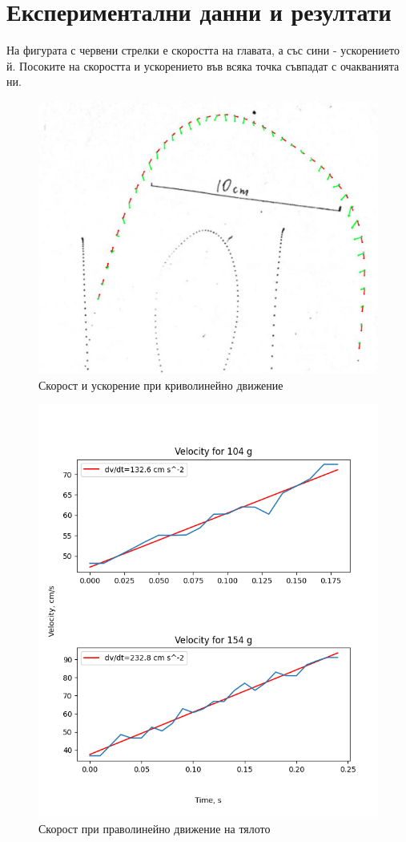 \documentclass[aps, prb, twocolumn, a4paper, floatfix, reprint]{revtex4-2}
\begin{document}
\section{Експериментални данни и резултати}

На фигурата с червени стрелки е скоростта на главата, а със сини - ускорението й. Посоките на скоростта и ускорението във всяка точка съвпадат с очакванията ни.
\begin{figure}[h]
    \caption{Скорост и ускорение при криволинейно движение}
    \includegraphics[width=0.9\columnwidth,keepaspectratio=true]{cropped_velocity_acceleration.png}
\end{figure}

\begin{figure}[H]
    \caption{Скорост при праволинейно движение на тялото}
    \includegraphics[width=0.9\columnwidth,keepaspectratio=true]{vel_charts_3.png}
\end{figure}
\end{document}
